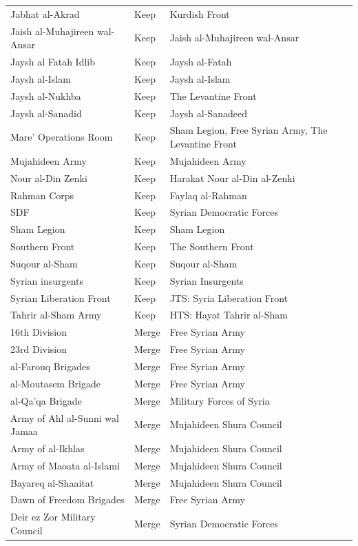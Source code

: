 \begin{longtable}{p{6.4cm} l p{6.0cm}}
Jabhat al-Akrad & Keep & Kurdish Front \\
Jaish al-Muhajireen wal-Ansar & Keep & Jaish al-Muhajireen wal-Ansar \\
Jaysh al Fatah Idlib & Keep & Jaysh al-Fatah \\
Jaysh al-Islam & Keep & Jaysh al-Islam \\
Jaysh al-Nukhba & Keep & The Levantine Front \\
Jaysh al-Sanadid & Keep & Jaysh al-Sanadeed \\
Mare' Operations Room & Keep & Sham Legion, Free Syrian Army, The Levantine Front \\
Mujahideen Army & Keep & Mujahideen Army \\
Nour al-Din Zenki & Keep & Harakat Nour al-Din al-Zenki \\
Rahman Corps & Keep & Faylaq al-Rahman \\
SDF & Keep & Syrian Democratic Forces \\
Sham Legion & Keep & Sham Legion \\
Southern Front & Keep & The Southern Front \\
Suqour al-Sham & Keep & Suqour al-Sham \\
Syrian insurgents\footnotemark[1] & Keep & Syrian Insurgents \\
Syrian Liberation Front & Keep & JTS: Syria Liberation Front \\
Tahrir al-Sham Army & Keep & HTS: Hayat Tahrir al-Sham \\
16th Division & Merge & Free Syrian Army \\
23rd Division & Merge & Free Syrian Army \\
al-Farouq Brigades & Merge & Free Syrian Army \\
al-Moutasem Brigade & Merge & Free Syrian Army \\
al-Qa'qa Brigade & Merge & Military Forces of Syria \\
Army of Ahl al-Sunni wal Jamaa & Merge & Mujahideen Shura Council \\
Army of al-Ikhlas & Merge & Mujahideen Shura Council \\
Army of Maoata al-Islami & Merge & Mujahideen Shura Council \\
Bayareq al-Shaaitat & Merge & Mujahideen Shura Council \\
Dawn of Freedom Brigades & Merge & Free Syrian Army \\
Deir ez Zor Military Council & Merge & Syrian Democratic Forces \\

\end{longtable}
